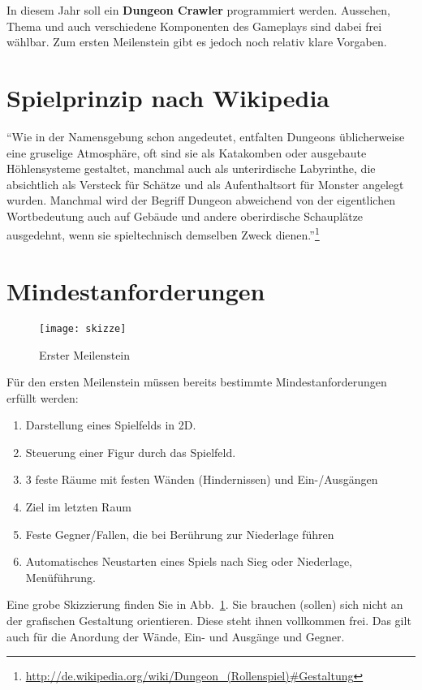 \documentclass{programmierpraktikum}
\subtitle{Erster Meilenstein}
\begin{document}
%
\maketitle
In diesem Jahr soll ein \textbf{Dungeon Crawler} programmiert werden. Aussehen, Thema und auch
verschiedene Komponenten des Gameplays sind dabei frei wählbar. Zum ersten Meilenstein gibt es
jedoch noch relativ klare Vorgaben.
%
\section{Spielprinzip nach Wikipedia}
"`Wie in der Namensgebung schon angedeutet, entfalten Dungeons üblicherweise eine gruselige
Atmosphäre, oft sind sie als Katakomben oder ausgebaute Höhlensysteme gestaltet, manchmal auch
als unterirdische Labyrinthe, die absichtlich als Versteck für Schätze und als Aufenthaltsort
für Monster angelegt wurden. Manchmal wird der Begriff Dungeon abweichend von der eigentlichen
Wortbedeutung auch auf Gebäude und andere oberirdische Schauplätze ausgedehnt, wenn sie spieltechnisch
demselben Zweck dienen."'\footnote{\url{http://de.wikipedia.org/wiki/Dungeon\_(Rollenspiel)\#Gestaltung}}
%
\section{Mindestanforderungen}
%
\begin{figure}[h!]
  \begin{center}
    \texttt{[image: skizze]}
    \caption{Erster Meilenstein\label{fig:skizze}}
  \end{center}
\end{figure}
Für den ersten Meilenstein müssen bereits bestimmte Mindestanforderungen erfüllt werden:
\begin{enumerate}
  \item Darstellung eines Spielfelds in 2D.
  \item Steuerung einer Figur durch das Spielfeld.
  \item 3 feste Räume mit festen Wänden (Hindernissen) und Ein-/Ausgängen
  \item Ziel im letzten Raum
  \item Feste Gegner/Fallen, die bei Berührung zur Niederlage führen
  \item Automatisches Neustarten eines Spiels nach Sieg oder Niederlage, Menüführung.
\end{enumerate}
Eine grobe Skizzierung finden Sie in Abb.~\ref{fig:skizze}. Sie brauchen (sollen) sich nicht an der
grafischen Gestaltung orientieren. Diese steht ihnen vollkommen frei. Das gilt auch für die
Anordung der Wände, Ein- und Ausgänge und Gegner.
\end{document}
